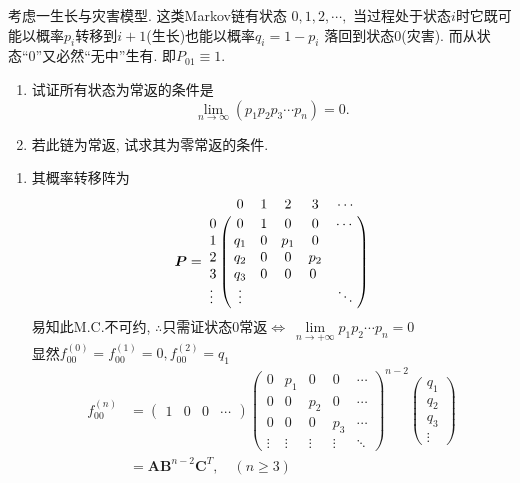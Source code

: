 \begin{problem}{3.16}
考虑一生长与灾害模型. 这类Markov链有状态 $0,1,2,\cdots,$ 当过程处于状态$i$时它既可能以概率$p_i$转移到$i+1$(生长)也能以概率$q_i = 1 - p_i$ 落回到状态$0$(灾害). 而从状态“0”又必然“无中”生有. 即$P_{01} \equiv 1$.
\begin{enumerate}[label=(\alph*)]
	\item 试证所有状态为常返的条件是\[\lim_{n\to \infty}(p_1p_2p_3\cdots p_n) = 0.\]
	\item 若此链为常返, 试求其为零常返的条件.
\end{enumerate}
\end{problem}
\begin{solution}[1]
	\begin{enumerate}[label=(\alph*)]
		\item 其概率转移阵为
		      \[
			      \bm{P} =
			      \bordermatrix{
				      ~ & 0   & 1 & 2   & 3   & \cdots \cr
				      0 & 0   & 1 & 0   & 0   & \cdots \cr
				      1 & q_1 & 0 & p_1 & 0   & ~ \cr
				      2 & q_2 & 0 & 0   & p_2 & ~ \cr
				      3 & q_3 & 0 & 0   & 0 ~ \cr
				      \vdots & \vdots & ~ & ~ & ~ & \ddots \cr
			      }
		      \]
		      易知此M.C.不可约, $\therefore$只需证状态$0$常返$\Leftrightarrow~\lim\limits_{n\to +\infty}p_1 p_2\cdots p_n = 0$\\
		      显然$f^{(0)}_{00} = f^{(1)}_{00} = 0, f^{(2)}_{00} = q_1$
		      \[
			      \begin{split}
				      f_{00}^{(n)} & =
				      \begin{pmatrix}
					      1 & 0 & 0 & \cdots
				      \end{pmatrix}
				      \begin{pmatrix}
					      0      & p_1    & 0      & 0      & \cdots \\
					      0      & 0      & p_2    & 0      & \cdots \\
					      0      & 0      & 0      & p_3    & \cdots \\
					      \vdots & \vdots & \vdots & \vdots & \ddots
				      \end{pmatrix}^{n-2}
				      \begin{pmatrix}
					      q_1 \\
					      q_2 \\
					      q_3 \\
					      \vdots
				      \end{pmatrix}\\
				      & = \bm{A}\bm{B}^{n-2}\bm{C}^T, \quad (n\geqslant 3)
			      \end{split}
\]
\end{enumerate}
\end{solution}
